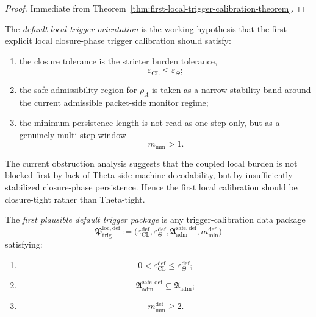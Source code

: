 \begin{proof}
Immediate from Theorem~\ref{thm:first-local-trigger-calibration-theorem}.
\end{proof}



\begin{definition}
\label{def:default-local-trigger-orientation}
The \emph{default local trigger orientation} is the working hypothesis that the first explicit local closure-phase trigger calibration should satisfy:
\begin{enumerate}
 \item the closure tolerance is the stricter burden tolerance,
 \[
 \varepsilon_{\mathrm{CL}} \le \varepsilon_{\Theta};
 \]
 \item the safe admissibility region for \(\rho_A\) is taken as a narrow stability band around the current admissible packet-side monitor regime;
 \item the minimum persistence length is not read as one-step only, but as a genuinely multi-step window
 \[
 m_{\min}>1.
 \]
\end{enumerate}
\end{definition}

\begin{remark}
\label{rem:why-closure-tolerance-should-be-stricter-first}
The current obstruction analysis suggests that the coupled local burden is not blocked first by lack of Theta-side machine decodability, but by insufficiently stabilized closure-phase persistence.
Hence the first local calibration should be closure-tight rather than Theta-tight.
\end{remark}

\begin{definition}
\label{def:first-plausible-default-trigger-package}
The \emph{first plausible default trigger package} is any trigger-calibration data package
\[
\mathfrak{P}_{\mathrm{trig}}^{\mathrm{loc,def}}
:=
\bigl(
\varepsilon_{\mathrm{CL}}^{\mathrm{def}},
\varepsilon_{\Theta}^{\mathrm{def}},
\mathfrak{A}_{\mathrm{adm}}^{\mathrm{safe,def}},
 m_{\min}^{\mathrm{def}}
\bigr)
\]
satisfying:
\begin{enumerate}
 \item
 \[
 0<\varepsilon_{\mathrm{CL}}^{\mathrm{def}} \le \varepsilon_{\Theta}^{\mathrm{def}};
 \]
 \item
 \[
 \mathfrak{A}_{\mathrm{adm}}^{\mathrm{safe,def}}
 \subseteq
 \mathfrak{A}_{\mathrm{adm}};
 \]
 \item
 \[
 m_{\min}^{\mathrm{def}}\ge 2.
 \]
\end{enumerate}
\end{definition}

